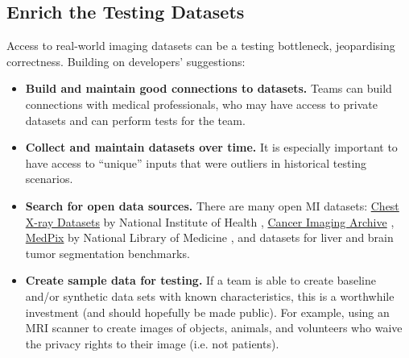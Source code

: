 \documentclass[doubleblind,12pt, 3p, times]{elsarticle}
\begin{document}
\subsection{Enrich the Testing Datasets} \label{sec_recommendations_testing_dataset}

Access to real-world imaging datasets can be a testing bottleneck,
jeopardising correctness. Building on developers' suggestions:

\begin{itemize}
\item \textbf{Build and maintain good connections to datasets.} 
Teams can build
connections with medical professionals, who may have
access to private datasets and can perform tests for the team.

\item \textbf{Collect and maintain datasets over time.} It is especially
important to have access to ``unique'' inputs that were outliers in
historical testing scenarios.

\item \textbf{Search for open data sources.} There are many open MI
datasets:
\href{https://nihcc.app.box.com/v/ChestXray-NIHCC}{Chest X-ray Datasets} by
National Institute of Health \cite{WangEtAl2017},
\href{https://www.cancerimagingarchive.net/}{Cancer Imaging Archive}
\cite{PriorEtAl2017}, \href{https://medpix.nlm.nih.gov/home}{MedPix} by
National Library of Medicine \cite{Smirniotopoulos2014}, and datasets for liver
\cite{BilicEtAl2019} and brain \cite{MenzeEtAl2015} tumor segmentation
benchmarks.

\item \textbf{Create sample data for testing.} If a team is able to create
baseline and/or synthetic data sets with known characteristics, this is a
worthwhile investment (and should hopefully be made public). For example, using
an MRI scanner to create images of objects, animals, and volunteers who waive
the privacy rights to their image (i.e. not patients).

%

\end{itemize}
\end{document}
